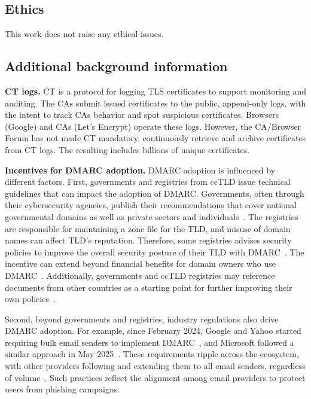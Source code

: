 \appendix
\label{sec:appendix}

\subsection{Ethics}
This work does not raise any ethical issues.

\subsection{Additional background information}
\textbf{\gls{CT} logs.}
\gls{CT} is a protocol for logging TLS certificates to support monitoring and auditing. The \glspl{CA} submit issued certificates to the public, append-only logs, with the intent to track \glspl{CA} behavior and spot suspicious certificates. Browsers (\eg Google) and \glspl{CA} (\eg Let's Encrypt) operate these logs.
However, the CA/Browser Forum has not made \gls{CT} mandatory.
\openintel continuously retrieve and archive certificates from \gls{CT} logs. The resulting \dataset includes billions of unique certificates.

\textbf{Incentives for DMARC adoption.}
\gls{DMARC} adoption is influenced by different factors. First, governments and registries from \gls{ccTLD} issue technical guidelines that can impact the adoption of \gls{DMARC}. Governments, often through their cybersecurity agencies, publish their recommendations that cover national governmental domains as well as private sectors and individuals~\cite{_BSITR03182Email_,_SecuringGovernmentEmail_2024,ccn-cert-es}.
The registries are responsible for maintaining a zone file for the \gls{TLD}, and misuse of domain names can affect \gls{TLD}'s reputation. Therefore, some registries advises security policies to improve the overall security posture of their \gls{TLD} with \gls{DMARC}~\cite{_Report2023Ch_,_GermanysBSIPublishes_}.
The incentive can extend beyond financial benefits for domain owners who use \gls{DMARC}~\cite{_Report2023Ch_}.
Additionally, governments and \gls{ccTLD} registries may reference documents from other countries as a starting point for further improving their own policies~\cite{_GermanysBSIPublishes_}.

Second, beyond governments and registries, industry regulations also drive \gls{DMARC} adoption. For example, since February 2024, Google and Yahoo started requiring bulk email senders to implement \gls{DMARC}~\cite{_NewGmailProtections_2023,_Yahoo_2023}, and Microsoft followed a similar approach in May 2025~\cite{_StrengtheningEmailEcosystem_}. These requirements ripple across the ecosystem, with other providers following and extending them to all email senders, regardless of volume~\cite{_AideLignePostmaster_,_EmailDomainAuthentication_}.
Such practices reflect the alignment among email providers to protect users from phishing campaigns.

